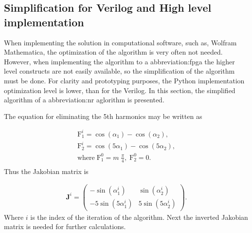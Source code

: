 \documentclass[a4paper, twoside, 11pt]{article}
\begin{document}
    \subsection{Simplification for Verilog and High level implementation}\label{subsec:simplification-for-verilog-and-high-level-implementation}
        When implementing the solution in computational software, such as, Wolfram Mathematica, the optimization of the algorithm is very often not needed. However, when implementing the algorithm to a \gls{abbreviation:fpga} the higher level constructs are not easily available, so the simplification of the algorithm must be done. For clarity and prototyping purposes, the Python implementation optimization level is lower, than for the Verilog. In this section, the simplified algorithm of a \gls{abbreviation:nr} aglorithm is presented.\par

        The equation for eliminating the 5th harmonics may be written as

        \begin{equation}
            \begin{gathered}
                \mathrm{F}_1^i = \cos(\alpha_1) - \cos(\alpha_2),\\
                \mathrm{F}_2^i = \cos(5\alpha_1) - \cos(5\alpha_2),\\
                \mathrm{where} \; \mathrm{F}_1^0 = m \; \frac{\pi}{4},\; \mathrm{F}_2^0 = 0.\\
            \end{gathered}
        \end{equation}
        Thus the Jakobian matrix is

        \begin{equation}
            \begin{gathered}
                \textbf{J}^i = 
                \begin{pmatrix}
                    - \sin(\alpha_1^i) & \sin(\alpha_2^i)\\
                    - 5 \sin(5\alpha_1^i) & 5 \sin(5\alpha_2^i)
                \end{pmatrix}.
            \end{gathered}
        \end{equation}
        Where $i$ is the index of the iteration of the algorithm. Next the inverted Jakobian matrix is needed for further calculations.
\end{document}
